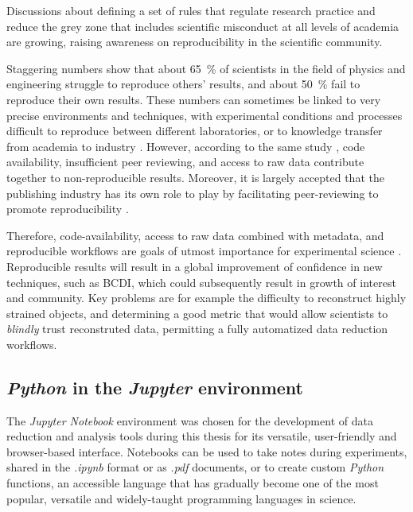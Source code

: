 Discussions about defining a set of rules that regulate research practice \parencite{Kretser2019} and reduce the grey zone that includes scientific misconduct at all levels of academia \parencite{Kornfeld2016} are growing, raising awareness on reproducibility in the scientific community.

Staggering numbers \parencite{Baker2016} show that about \qty{65}{\percent} of scientists in the field of physics and engineering struggle to reproduce others' results, and about \qty{50}{\percent} fail to reproduce their own results.
These numbers can sometimes be linked to very precise environments and techniques, with experimental conditions and processes difficult to reproduce between different laboratories, or to knowledge transfer from academia to industry \parencite{DanielSarwitz2015}.
However, according to the same study \parencite{Baker2016}, code availability, insufficient peer reviewing, and access to raw data contribute together to non-reproducible results.
Moreover, it is largely accepted that the publishing industry has its own role to play by facilitating peer-reviewing to promote reproducibility \parencite{Lee2017}.

Therefore, code-availability, access to raw data combined with metadata, and reproducible workflows are goals of utmost importance for experimental science \parencite{Munafo2017}.
Reproducible results will result in a global improvement of confidence in new techniques, such as BCDI, which could subsequently result in growth of interest and community.
Key problems are for example the difficulty to reconstruct highly strained objects, and determining a good metric that would allow scientists to \textit{blindly} trust reconstruted data, permitting a fully automatized data reduction workflows.

\subsection{\textit{Python} in the \textit{Jupyter} environment}

The \textit{Jupyter Notebook} environment \parencite{IPython, Kluyver2016jupyter} was chosen for the development of data reduction and analysis tools during this thesis for its versatile, user-friendly and browser-based interface.
Notebooks can be used to take notes during experiments, shared in the \textit{.ipynb} format or as \textit{.pdf} documents, or to create custom \textit{Python} functions, an accessible language that has gradually become one of the most popular, versatile \parencite{IPython, Newville2016} and widely-taught \parencite{Scopatz2015, McKinney2017, Boulle2019} programming languages in science.

